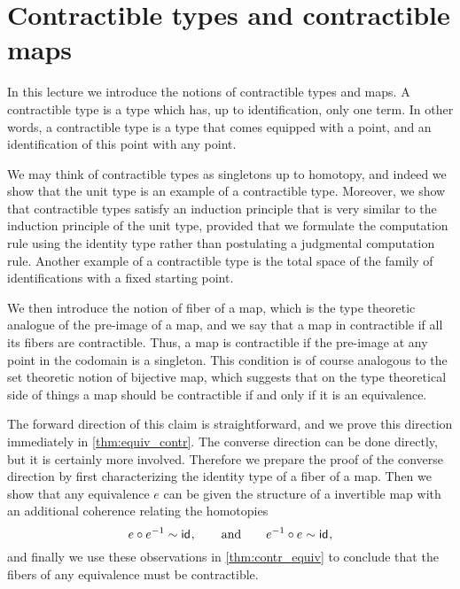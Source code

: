 
\chapter{Contractible types and contractible maps}

In this lecture we introduce the notions of contractible types and maps. A contractible type is a type which has, up to identification, only one term. In other words, a contractible type is a type that comes equipped with a point, and an identification of this point with any point.

We may think of contractible types as singletons up to homotopy, and indeed we show that the unit type is an example of a contractible type. Moreover, we show that contractible types satisfy an induction principle that is very similar to the induction principle of the unit type, provided that we formulate the computation rule using the identity type rather than postulating a judgmental computation rule. Another example of a contractible type is the total space of the family of identifications with a fixed starting point.

We then introduce the notion of fiber of a map, which is the type theoretic analogue of the pre-image of a map, and we say that a map in contractible if all its fibers are contractible. Thus, a map is contractible if the pre-image at any point in the codomain is a singleton. This condition is of course analogous to the set theoretic notion of bijective map, which suggests that on the type theoretical side of things a map should be contractible if and only if it is an equivalence.

The forward direction of this claim is straightforward, and we prove this direction immediately in \cref{thm:equiv_contr}. The converse direction can be done directly, but it is certainly more involved. Therefore we prepare the proof of the converse direction by first characterizing the identity type of a fiber of a map. Then we show that any equivalence $e$ can be given the structure of a invertible map with an additional coherence relating the homotopies
\begin{equation*}
  e\circ e^{-1}\sim \mathsf{id}_{},\qquad\text{and}\qquad e^{-1}\circ e\sim\mathsf{id}_{},
\end{equation*}
and finally we use these observations in \cref{thm:contr_equiv} to conclude that the fibers of any equivalence must be contractible.

